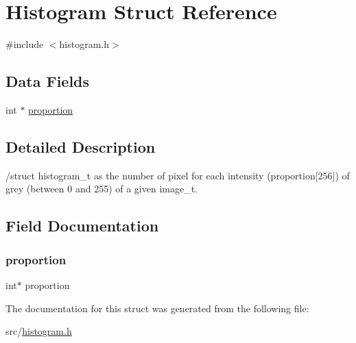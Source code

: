 \hypertarget{struct_histogram}{}\section{Histogram Struct Reference}
\label{struct_histogram}


{\ttfamily \#include $<$histogram.\+h$>$}

\subsection*{Data Fields}
\begin{DoxyCompactItemize}
\item 
int $\ast$ \mbox{\hyperlink{struct_histogram_a6e6e5ea5592d0fea041f7259007bd17b}{proportion}}
\end{DoxyCompactItemize}


\subsection{Detailed Description}
/struct histogram\+\_\+t as the number of pixel for each intensity (proportion\mbox{[}256\mbox{]}) of grey (between 0 and 255) of a given image\+\_\+t. 

\subsection{Field Documentation}
\mbox{\label{struct_histogram_a6e6e5ea5592d0fea041f7259007bd17b}} 
\subsubsection{\texorpdfstring{proportion}{proportion}}
{\footnotesize\ttfamily int$\ast$ proportion}



The documentation for this struct was generated from the following file\+:\begin{DoxyCompactItemize}
\item 
src/\mbox{\hyperlink{histogram_8h}{histogram.\+h}}\end{DoxyCompactItemize}
